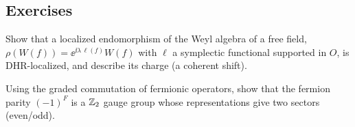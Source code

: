 \subsection*{Exercises}
\begin{exercise}\label{ex:dhr:1}
Show that a localized endomorphism of the Weyl algebra of a free field, $\rho(W(f))=\ee^{\ii\lambda\,\ell(f)}W(f)$ with $\ell$ a symplectic functional supported in $O$, is DHR-localized, and describe its charge (a coherent shift).
\end{exercise}
\begin{exercise}\label{ex:dhr:2}
Using the graded commutation of fermionic operators, show that the fermion parity $(-1)^F$ is a $\mathbb{Z}_2$ gauge group whose representations give two sectors (even/odd).
\end{exercise}

